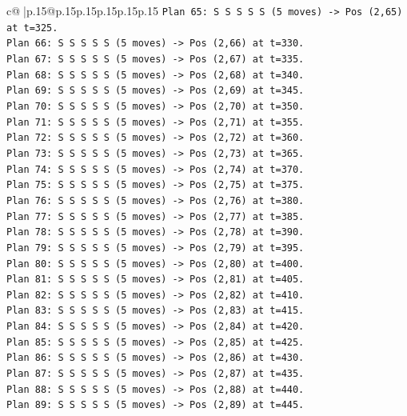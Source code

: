 \documentclass{article}
\begin{document}
{\begin{supertabular}{c@{$\;$}|p{.15\linewidth}@{}p{.15\linewidth}p{.15\linewidth}p{.15\linewidth}p{.15\linewidth}p{.15\linewidth}}
{{{\texttt{Plan 65: S S S S S (5 moves) {-}> Pos (2,65) at t=325.} \\
\texttt{Plan 66: S S S S S (5 moves) {-}> Pos (2,66) at t=330.} \\
\texttt{Plan 67: S S S S S (5 moves) {-}> Pos (2,67) at t=335.} \\
\texttt{Plan 68: S S S S S (5 moves) {-}> Pos (2,68) at t=340.} \\
\texttt{Plan 69: S S S S S (5 moves) {-}> Pos (2,69) at t=345.} \\
\texttt{Plan 70: S S S S S (5 moves) {-}> Pos (2,70) at t=350.} \\
\texttt{Plan 71: S S S S S (5 moves) {-}> Pos (2,71) at t=355.} \\
\texttt{Plan 72: S S S S S (5 moves) {-}> Pos (2,72) at t=360.} \\
\texttt{Plan 73: S S S S S (5 moves) {-}> Pos (2,73) at t=365.} \\
\texttt{Plan 74: S S S S S (5 moves) {-}> Pos (2,74) at t=370.} \\
\texttt{Plan 75: S S S S S (5 moves) {-}> Pos (2,75) at t=375.} \\
\texttt{Plan 76: S S S S S (5 moves) {-}> Pos (2,76) at t=380.} \\
\texttt{Plan 77: S S S S S (5 moves) {-}> Pos (2,77) at t=385.} \\
\texttt{Plan 78: S S S S S (5 moves) {-}> Pos (2,78) at t=390.} \\
\texttt{Plan 79: S S S S S (5 moves) {-}> Pos (2,79) at t=395.} \\
\texttt{Plan 80: S S S S S (5 moves) {-}> Pos (2,80) at t=400.} \\
\texttt{Plan 81: S S S S S (5 moves) {-}> Pos (2,81) at t=405.} \\
\texttt{Plan 82: S S S S S (5 moves) {-}> Pos (2,82) at t=410.} \\
\texttt{Plan 83: S S S S S (5 moves) {-}> Pos (2,83) at t=415.} \\
\texttt{Plan 84: S S S S S (5 moves) {-}> Pos (2,84) at t=420.} \\
\texttt{Plan 85: S S S S S (5 moves) {-}> Pos (2,85) at t=425.} \\
\texttt{Plan 86: S S S S S (5 moves) {-}> Pos (2,86) at t=430.} \\
\texttt{Plan 87: S S S S S (5 moves) {-}> Pos (2,87) at t=435.} \\
\texttt{Plan 88: S S S S S (5 moves) {-}> Pos (2,88) at t=440.} \\
\texttt{Plan 89: S S S S S (5 moves) {-}> Pos (2,89) at t=445.} \\
}}}
\end{supertabular}}
\end{document}
